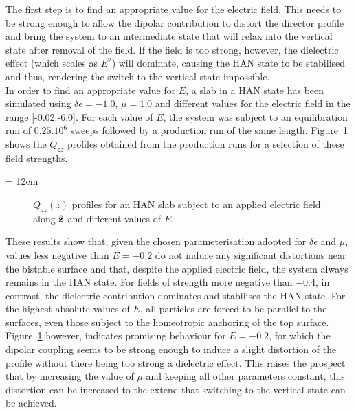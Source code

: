 The first step is to find an appropriate value for the electric field. This needs to be strong
enough to allow the dipolar contribution to distort the director profile and bring the system to
an intermediate state that will relax into the vertical state after removal of the field. 
If the field is too strong, however, the dielectric effect (which scales as $E^2$) will
dominate, causing the HAN state to be
stabilised and thus, rendering the switch to the vertical state impossible.\\
In order to find an appropriate value for $E$, a slab in a HAN state has been simulated using
$\delta\epsilon = -1.0$, $\mu = 1.0$ and different values for the electric field in the range
[-0.02:-6.0]. For each value
of $E$, the system was subject to an equilibration run of $0.25.10^6$ sweeps followed by a
production run of the same length. Figure~\ref{fig:hardSwitch_QzzEinfl} shows the $Q_{zz}$
profiles obtained from the production runs for a selection of these field strengths.

\picW = 12cm
\begin{figure}
	\centering
	\caption{$Q_{zz}(z)$ profiles for an HAN slab subject to an applied electric field along 
	$\mathbf{\hat{z} }$ and different values of $E$.}
	\label{fig:hardSwitch_QzzEinfl}
\end{figure}

These results show that, given the chosen parameterisation adopted for $\delta\epsilon$ and $\mu$,
values less negative than $E = -0.2$ do not induce any significant distortions near the bistable
surface and that, despite the
applied electric field, the system always remains in the HAN state. For fields of strength more
negative than
$-0.4$, in contrast, the dielectric contribution dominates and stabilises the HAN state. 
For the highest absolute
values of $E$, all particles are forced to be parallel to the surfaces, even those subject to the
homeotropic anchoring of the top surface. Figure~\ref{fig:hardSwitch_QzzEinfl} however,
indicates
promising behaviour for $E=-0.2$, for which the dipolar coupling seems to be strong enough 
to induce a slight distortion of the profile without there being too strong a dielectric effect. 
This raises the prospect that by increasing the
value of $\mu$ and keeping all other parameters constant, this distortion can
be increased to the extend that switching to the vertical state can be
achieved.


